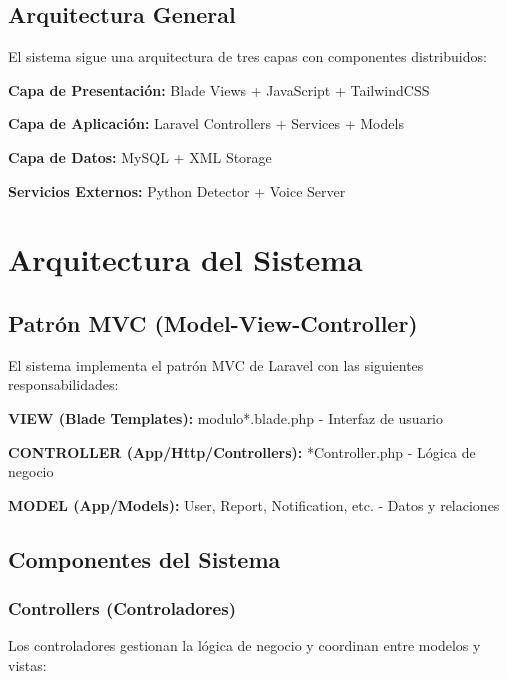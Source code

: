 \documentclass[12pt,a4paper]{article}
\begin{document}
\subsection{Arquitectura General}

El sistema sigue una arquitectura de tres capas con componentes distribuidos:

\textbf{Capa de Presentación:} Blade Views + JavaScript + TailwindCSS

\textbf{Capa de Aplicación:} Laravel Controllers + Services + Models

\textbf{Capa de Datos:} MySQL + XML Storage

\textbf{Servicios Externos:} Python Detector + Voice Server

\newpage

\section{Arquitectura del Sistema}

\subsection{Patrón MVC (Model-View-Controller)}

El sistema implementa el patrón MVC de Laravel con las siguientes responsabilidades:

\textbf{VIEW (Blade Templates):} modulo*.blade.php - Interfaz de usuario

\textbf{CONTROLLER (App/Http/Controllers):} *Controller.php - Lógica de negocio

\textbf{MODEL (App/Models):} User, Report, Notification, etc. - Datos y relaciones

\subsection{Componentes del Sistema}

\subsubsection{Controllers (Controladores)}

Los controladores gestionan la lógica de negocio y coordinan entre modelos y vistas:
\end{document}
